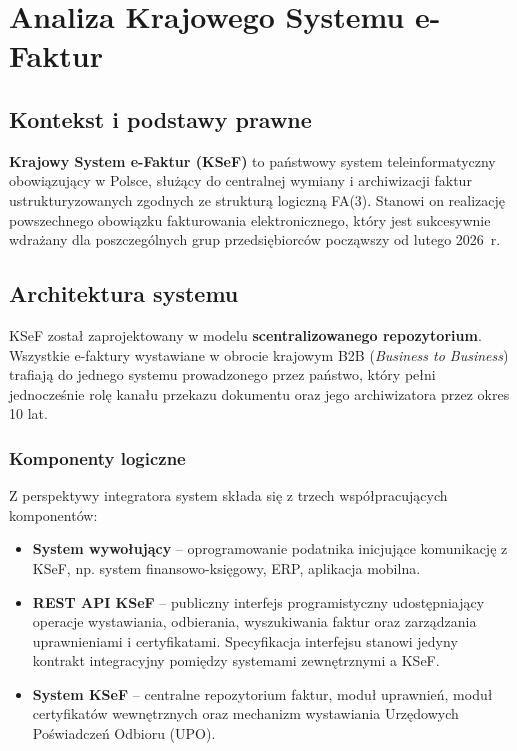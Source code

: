 \section{Analiza Krajowego Systemu e-Faktur}
\label{sec:ksef}

\subsection{Kontekst i podstawy prawne}
\label{sec:ksef-kontekst}

\textbf{Krajowy System e-Faktur (KSeF)} to państwowy system teleinformatyczny obowiązujący w Polsce, służący do centralnej wymiany i archiwizacji faktur ustrukturyzowanych zgodnych ze strukturą logiczną FA(3). Stanowi on realizację powszechnego obowiązku fakturowania elektronicznego, który jest sukcesywnie wdrażany dla poszczególnych grup przedsiębiorców począwszy od lutego 2026~r. \cite{ksef-w-pigulce,ksef-plan-wdrozenia}

\subsection{Architektura systemu}
\label{sec:ksef-architektura}

KSeF został zaprojektowany w modelu \textbf{scentralizowanego repozytorium}. Wszystkie e-faktury wystawiane w obrocie krajowym B2B (\textit{Business to Business}) trafiają do jednego systemu prowadzonego przez państwo, który pełni jednocześnie rolę kanału przekazu dokumentu oraz jego archiwizatora przez okres 10 lat. \cite{ksef-w-pigulce}

\subsubsection{Komponenty logiczne}
\label{sec:ksef-komponenty}

Z perspektywy integratora system składa się z trzech współpracujących komponentów: \cite{ksef-docs-repo}

\begin{itemize}
    \item \textbf{System wywołujący} -- oprogramowanie podatnika inicjujące komunikację z KSeF, np. system finansowo-księgowy, ERP, aplikacja mobilna.
    \item \textbf{REST API KSeF} -- publiczny interfejs programistyczny udostępniający operacje wystawiania, odbierania, wyszukiwania faktur oraz zarządzania uprawnieniami i certyfikatami. Specyfikacja interfejsu stanowi jedyny kontrakt integracyjny pomiędzy systemami zewnętrznymi a KSeF. \cite{ksef-publikacja-api}
    \item \textbf{System KSeF} -- centralne repozytorium faktur, moduł uprawnień, moduł certyfikatów wewnętrznych oraz mechanizm wystawiania Urzędowych Poświadczeń Odbioru (UPO). \cite{ksef-docs-przeglad}
\end{itemize}

